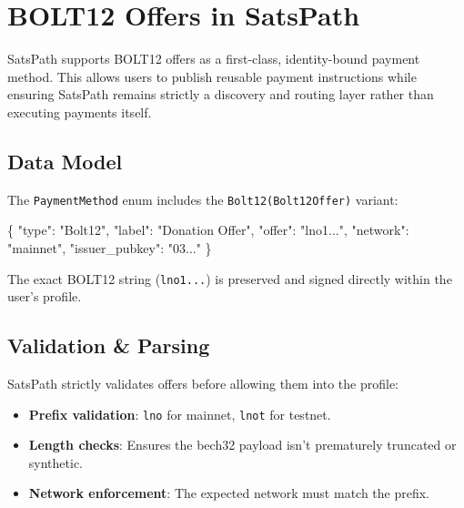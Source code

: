 \documentclass[
]{article}
\author{}
\date{}
\newenvironment{Shaded}{}{}
\newcommand{\DataTypeTok}[1]{\textcolor[rgb]{0.56,0.13,0.00}{#1}}
\newcommand{\FunctionTok}[1]{\textcolor[rgb]{0.02,0.16,0.49}{#1}}
\newcommand{\StringTok}[1]{\textcolor[rgb]{0.25,0.44,0.63}{#1}}
\providecommand{\tightlist}{%
  \setlength{\itemsep}{0pt}\setlength{\parskip}{0pt}}
\begin{document}
\hypertarget{bolt12-offers-in-satspath}{%
\section{BOLT12 Offers in SatsPath}\label{bolt12-offers-in-satspath}}

SatsPath supports BOLT12 offers as a first-class, identity-bound payment
method. This allows users to publish reusable payment instructions while
ensuring SatsPath remains strictly a discovery and routing layer rather
than executing payments itself.

\hypertarget{data-model}{%
\subsection{Data Model}\label{data-model}}

The \texttt{PaymentMethod} enum includes the
\texttt{Bolt12(Bolt12Offer)} variant:

\begin{Shaded}
\begin{Highlighting}[]
\FunctionTok{\{}
  \DataTypeTok{"type"}\FunctionTok{:} \StringTok{"Bolt12"}\FunctionTok{,}
  \DataTypeTok{"label"}\FunctionTok{:} \StringTok{"Donation Offer"}\FunctionTok{,}
  \DataTypeTok{"offer"}\FunctionTok{:} \StringTok{"lno1..."}\FunctionTok{,}
  \DataTypeTok{"network"}\FunctionTok{:} \StringTok{"mainnet"}\FunctionTok{,}
  \DataTypeTok{"issuer\_pubkey"}\FunctionTok{:} \StringTok{"03..."}
\FunctionTok{\}}
\end{Highlighting}
\end{Shaded}

The exact BOLT12 string (\texttt{lno1...}) is preserved and signed
directly within the user's profile.

\hypertarget{validation-parsing}{%
\subsection{Validation \& Parsing}\label{validation-parsing}}

SatsPath strictly validates offers before allowing them into the
profile:

\begin{itemize}
\tightlist
\item
  \textbf{Prefix validation}: \texttt{lno} for mainnet, \texttt{lnot}
  for testnet.
\item
  \textbf{Length checks}: Ensures the bech32 payload isn't prematurely
  truncated or synthetic.
\item
  \textbf{Network enforcement}: The expected network must match the
  prefix.
\end{itemize}
\end{document}
